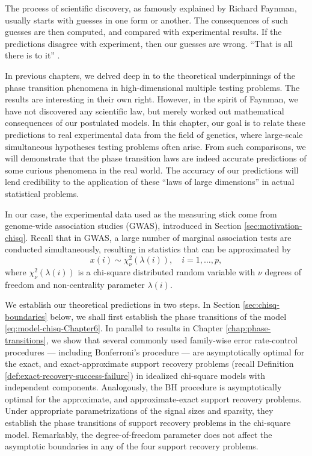 
The process of scientific discovery, as famously explained by Richard Faynman, usually starts with guesses in one form or another.
The consequences of such guesses are then computed, and compared with experimental results.
If the predictions disagree with experiment, then our guesses are wrong. ``That is all there is to it''  \citep{feynman2017character}.

In previous chapters, we delved deep in to the theoretical underpinnings of the phase transition phenomena in high-dimensional multiple testing problems.
The results are interesting in their own right.
However, in the spirit of Faynman, we have not discovered any scientific law, but merely worked out mathematical consequences of our postulated models.
In this chapter, our goal is to relate these predictions to real experimental data from the field of genetics, where large-scale simultaneous hypotheses testing problems often arise.
From such comparisons, we will demonstrate that the phase transition laws are indeed accurate predictions of some curious phenomena in the real world.
The accuracy of our predictions will lend credibility to the application of these ``laws of large dimensions'' in actual statistical problems.

\medskip

In our case, the experimental data used as the measuring stick come from genome-wide association studies (\ac{GWAS}), introduced in Section \ref{sec:motivation-chisq}.
Recall that in \ac{GWAS}, a large number of marginal association tests are conducted simultaneously, resulting in statistics that can be approximated by
\begin{equation} \label{eq:model-chisq-Chapter6}
    x(i) \sim \chi_\nu^2\left(\lambda(i)\right), \quad i=1,\ldots,p,
\end{equation}
where $\chi_\nu^2\left(\lambda(i)\right)$ is a chi-square distributed random variable with $\nu$ degrees of freedom and non-centrality parameter $\lambda(i)$.

We establish our theoretical predictions in two steps.
In Section \ref{sec:chisq-boundaries} below, we shall first establish the phase transitions of the model \eqref{eq:model-chisq-Chapter6}.
In parallel to results in Chapter \ref{chap:phase-transitions}, we show that several commonly used family-wise error rate-control procedures --- including Bonferroni's procedure --- are asymptotically optimal for the {exact}, and {exact-approximate} support recovery problems (recall Definition \ref{def:exact-recovery-success-failure}) in idealized chi-square models with independent components.
Analogously, the \ac{BH} procedure is asymptotically optimal for the {approximate}, and {approximate-exact} support recovery problems.
Under appropriate parametrizations of the signal sizes and sparsity, they establish the phase transitions of support recovery problems in the chi-square model.
Remarkably, the degree-of-freedom parameter does not affect the asymptotic boundaries in any of the four support recovery problems.

